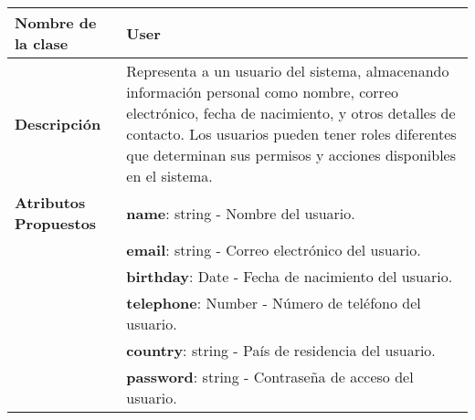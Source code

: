 \begin{clases}
	\centering
	\begin{tabular}{|>{\raggedright\arraybackslash}p{4cm}|p{12cm}|}
		\hline
		\textbf{Nombre de la clase}   & \textbf{User}                                                                                                                                                                                                                                                          \\
		\hline
		\textbf{Descripción}          & Representa a un usuario del sistema, almacenando información personal como nombre, correo electrónico, fecha de nacimiento, y otros detalles de contacto. Los usuarios pueden tener roles diferentes que determinan sus permisos y acciones disponibles en el sistema. \\
		\hline
		\textbf{Atributos Propuestos} & \textbf{name}: string - Nombre del usuario.                                                                                                                                                                                                                            \\
		                              & \textbf{email}: string - Correo electrónico del usuario.                                                                                                                                                                                                               \\
		                              & \textbf{birthday}: Date - Fecha de nacimiento del usuario.                                                                                                                                                                                                             \\
		                              & \textbf{telephone}: Number - Número de teléfono del usuario.                                                                                                                                                                                                           \\
		                              & \textbf{country}: string - País de residencia del usuario.                                                                                                                                                                                                             \\
		                              & \textbf{password}: string - Contraseña de acceso del usuario.                                                                                                                                                                                                          \\

\end{tabular}
\end{clases}
